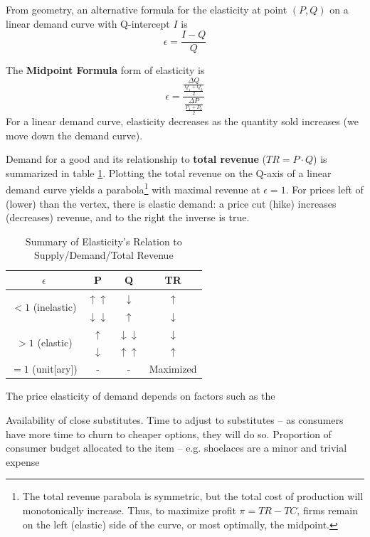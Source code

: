 \documentclass{article}
\begin{document}
From geometry, an alternative formula for the elasticity at point $(P,Q)$ on a linear demand curve with Q-intercept $I$ is \[\epsilon = \frac{I-Q}{Q}\]

The \textbf{Midpoint Formula} form of elasticity is
\[\epsilon = \frac{\frac{\Delta Q}{\frac{Q_1+Q_2}{2}}}{\frac{\Delta P}{\frac{P_1+P_2}{2}}}\]
For a linear demand curve, elasticity decreases as the quantity sold increases (we move down the demand curve).

Demand for a good and its relationship to \textbf{total revenue} ($TR=P\cdot Q$) is summarized in table \ref{tab:3.1}.
Plotting the total revenue on the Q-axis of a linear demand curve yields a parabola\footnote{The total revenue parabola is symmetric, but the total cost of production will monotonically increase. Thus, to maximize profit $\pi = TR-TC$, firms remain on the left (elastic) side of the curve, or most optimally, the midpoint.} with maximal revenue at $\epsilon=1$. For prices left of (lower) than the vertex, there is elastic demand: a price cut (hike) increases (decreases) revenue, and to the right the inverse is true.

\begin{table}[hb]
    \centering
    \begin{tabular}{c|c|c|c}
    $\epsilon$                        & P                                                  & Q                                                  & TR                        \\ \hline
    \multirow{2}{*}{$<1$ (inelastic)} & $\uparrow\uparrow$     & $\downarrow$           & $\uparrow$   \\ \cline{2-4}
                                      & $\downarrow\downarrow$ & $\uparrow$             & $\downarrow$ \\ \hline
    \multirow{2}{*}{$>1$ (elastic)}   & $\uparrow$             & $\downarrow\downarrow$ & $\downarrow$ \\ \cline{2-4}
                                      & $\downarrow$           & $\uparrow\uparrow$     & $\uparrow$   \\ \hline
    $=1$ (unit[ary])                  & -                      & -                      & Maximized
    \end{tabular}
    \caption{Summary of Elasticity's Relation to Supply/Demand/Total Revenue}
    \label{tab:3.1}
\end{table}

The price elasticity of demand depends on factors such as the
\begin{outline}
	\1 Availability of close substitutes.
	\1 Time to adjust to substitutes -- as consumers have more time to churn to cheaper options, they will do so.
	\1 Proportion of consumer budget allocated to the item -- e.g. shoelaces are a minor and trivial expense
\end{outline}
\end{document}
